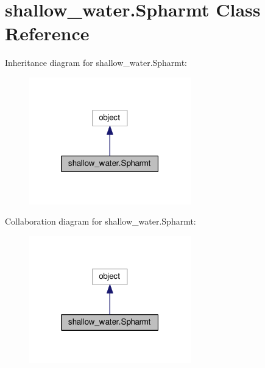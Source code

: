 \hypertarget{classshallow__water_1_1Spharmt}{}\section{shallow\+\_\+water.\+Spharmt Class Reference}
\label{classshallow__water_1_1Spharmt}


Inheritance diagram for shallow\+\_\+water.\+Spharmt\+:
\nopagebreak
\begin{figure}[H]
\begin{center}
\leavevmode
\includegraphics[width=199pt]{classshallow__water_1_1Spharmt__inherit__graph}
\end{center}
\end{figure}


Collaboration diagram for shallow\+\_\+water.\+Spharmt\+:
\nopagebreak
\begin{figure}[H]
\begin{center}
\leavevmode
\includegraphics[width=199pt]{classshallow__water_1_1Spharmt__coll__graph}
\end{center}
\end{figure}
